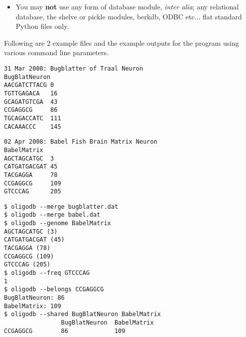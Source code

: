\begin{enumerate}
\begin{itemize}
	\item You may \textbf{not} use any form of database module, \textit{inter alia}; any relational database, the shelve or pickle modules, berkdb, ODBC etc... flat standard Python files only.
\end{itemize}     Following are 2 example files and the example outputs for the    program using various command line parameters.  
\begin{lstlisting}
31 Mar 2008: Bugblatter of Traal Neuron
BugBlatNeuron
AACGATCTTACG 0
TGTTGAGACA   16
GCAGATGTCGA  43
CCGAGGCG     86
TGCAGACCATC  111
CACAAACCC    145\end{lstlisting}
\begin{lstlisting}
02 Apr 2008: Babel Fish Brain Matrix Neuron
BabelMatrix
AGCTAGCATGC  3
CATGATGACGAT 45
TACGAGGA     78
CCGAGGCG     109
GTCCCAG      205\end{lstlisting}
\begin{lstlisting}
$ oligodb --merge bugblatter.dat
$ oligodb --merge babel.dat
$ oligodb --genome BabelMatrix
AGCTAGCATGC (3)
CATGATGACGAT (45)
TACGAGGA (78)
CCGAGGCG (109)
GTCCCAG (205)
$ oligodb --freq GTCCCAG
1
$ oligodb --belongs CCGAGGCG
BugBlatNeuron: 86
BabelMatrix: 109
$ oligodb --shared BugBlatNeuron BabelMatrix
                BugBlatNeuron  BabelMatrix
CCGAGGCG        86             109\end{lstlisting}
\end{enumerate}

